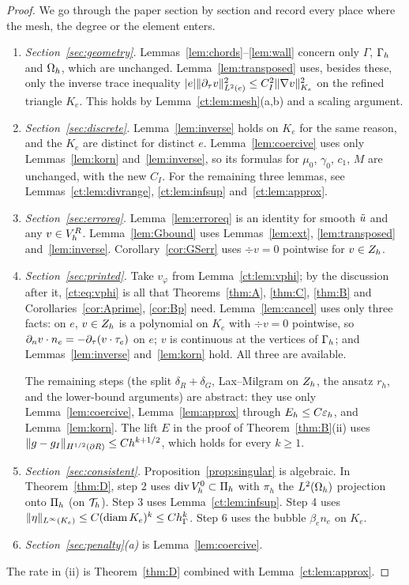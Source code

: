 \begin{proof}
We go through the paper section by section and record every place where the mesh, the degree or the element enters.
\begin{enumerate}
\item \emph{Section~\ref{sec:geometry}.} Lemmas~\ref{lem:chords}--\ref{lem:wall} concern only $\Gamma$, $\Gamma_h$ and $\Omega_h$, which are unchanged. Lemma~\ref{lem:transposed} uses, besides these, only the inverse trace inequality $|e|\lVert \partial_\tau v\rVert_{L^2(e)}^2\le C_I^2\lVert \nabla v\rVert^2_{K_e}$ on the refined triangle $K_e$. This holds by Lemma~\ref{ct:lem:mesh}(a,b) and a scaling argument.
\item \emph{Section~\ref{sec:discrete}.} Lemma~\ref{lem:inverse} holds on $K_e$ for the same reason, and the $K_e$ are distinct for distinct $e$. Lemma~\ref{lem:coercive} uses only Lemmas~\ref{lem:korn} and~\ref{lem:inverse}, so its formulas for $\mu_0$, $\gamma_0$, $c_1$, $M$ are unchanged, with the new $C_I$. For the remaining three lemmas, see Lemmas~\ref{ct:lem:divrange}, \ref{ct:lem:infsup} and~\ref{ct:lem:approx}.
\item \emph{Section~\ref{sec:erroreq}.} Lemma~\ref{lem:erroreq} is an identity for smooth $\tilde u$ and any $v\in V_h^R$. Lemma~\ref{lem:Gbound} uses Lemmas~\ref{lem:ext}, \ref{lem:transposed} and~\ref{lem:inverse}. Corollary~\ref{cor:GSerr} uses $\div v=0$ pointwise for $v\in Z_h$.
\item \emph{Section~\ref{sec:printed}.} Take $v_\varphi$ from Lemma~\ref{ct:lem:vphi}; by the discussion after it, \eqref{ct:eq:vphi} is all that Theorems~\ref{thm:A}, \ref{thm:C}, \ref{thm:B} and Corollaries~\ref{cor:Aprime}, \ref{cor:Bp} need. Lemma~\ref{lem:cancel} uses only three facts: on $e$, $v\in Z_h$ is a polynomial on $K_e$ with $\div v=0$ pointwise, so $\partial_n v\cdot n_e=-\partial_\tau(v\cdot\tau_e)$ on $e$; $v$ is continuous at the vertices of $\Gamma_h$; and Lemmas~\ref{lem:inverse} and~\ref{lem:korn} hold. All three are available.

The remaining steps (the split $\delta_R+\delta_G$, Lax--Milgram on $Z_h$, the ansatz $r_h$, and the lower-bound arguments) are abstract: they use only Lemma~\ref{lem:coercive}, Lemma~\ref{lem:approx} through $E_h\le C\varepsilon_h$, and Lemma~\ref{lem:korn}. The lift $E$ in the proof of Theorem~\ref{thm:B}(ii) uses $\lVert g-g_I\rVert_{H^{1/2}(\partial R)}\le Ch^{k+1/2}$, which holds for every $k\ge1$.
\item \emph{Section~\ref{sec:consistent}.} Proposition~\ref{prop:singular} is algebraic. In Theorem~\ref{thm:D}, step 2 uses $\operatorname{div}V_h^0\subset\Pi_h$ with $\pi_h$ the $L^2(\Omega_h)$ projection onto $\Pi_h$ (on $\mathcal T_h$). Step 3 uses Lemma~\ref{ct:lem:infsup}. Step 4 uses $\lVert \eta\rVert_{L^\infty(K_e)}\le C(\operatorname{diam} K_e)^k\le Ch_\Gamma^k$. Step 6 uses the bubble $\beta_en_e$ on $K_e$.
\item \emph{Section~\ref{sec:penalty}(a)} is Lemma~\ref{lem:coercive}.
\end{enumerate}
The rate in (ii) is Theorem~\ref{thm:D} combined with Lemma~\ref{ct:lem:approx}.
\end{proof}

